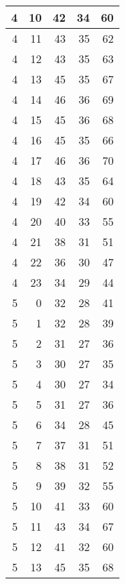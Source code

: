 \begin{longtable}{|r|r|r|r|r|}
    \hline
    4     & 10    & 42    & 34    & 60 \\
    \hline
    4     & 11    & 43    & 35    & 62 \\
    \hline
    4     & 12    & 43    & 35    & 63 \\
    \hline
    4     & 13    & 45    & 35    & 67 \\
    \hline
    4     & 14    & 46    & 36    & 69 \\
    \hline
    4     & 15    & 45    & 36    & 68 \\
    \hline
    4     & 16    & 45    & 35    & 66 \\
    \hline
    4     & 17    & 46    & 36    & 70 \\
    \hline
    4     & 18    & 43    & 35    & 64 \\
    \hline
    4     & 19    & 42    & 34    & 60 \\
    \hline
    4     & 20    & 40    & 33    & 55 \\
    \hline
    4     & 21    & 38    & 31    & 51 \\
    \hline
    4     & 22    & 36    & 30    & 47 \\
    \hline
    4     & 23    & 34    & 29    & 44 \\
    \hline
    5     & 0     & 32    & 28    & 41 \\
    \hline
    5     & 1     & 32    & 28    & 39 \\
    \hline
    5     & 2     & 31    & 27    & 36 \\
    \hline
    5     & 3     & 30    & 27    & 35 \\
    \hline
    5     & 4     & 30    & 27    & 34 \\
    \hline
    5     & 5     & 31    & 27    & 36 \\
    \hline
    5     & 6     & 34    & 28    & 45 \\
    \hline
    5     & 7     & 37    & 31    & 51 \\
    \hline
    5     & 8     & 38    & 31    & 52 \\
    \hline
    5     & 9     & 39    & 32    & 55 \\
    \hline
    5     & 10    & 41    & 33    & 60 \\
    \hline
    5     & 11    & 43    & 34    & 67 \\
    \hline
    5     & 12    & 41    & 32    & 60 \\
    \hline
    5     & 13    & 45    & 35    & 68 \\

\end{longtable}
